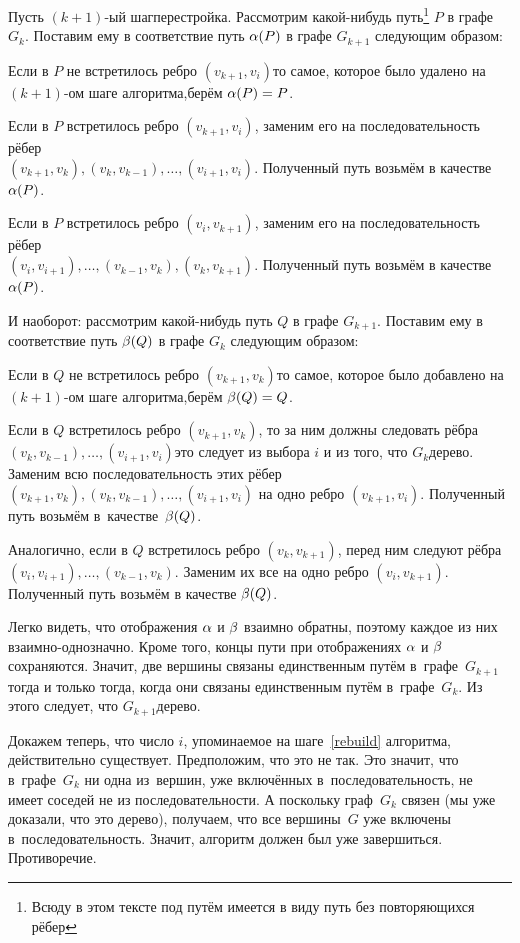 \documentclass[a4paper,12pt]{article}
\begin{document}
Пусть $(k+1)$-ый шаг\т перестройка. Рассмотрим какой-нибудь путь\footnote{Всюду в этом тексте под путём имеется в виду путь без повторяющихся рёбер} $P$ в графе $G_k$. Поставим ему в соответствие путь $\alpha(P)$ в графе $G_{k+1}$ следующим образом:
\begin{items}{-3}
\item
Если в $P$ не встретилось ребро $(v_{k+1}, v_i)$\т то самое, которое было удалено на $(k+1)$-ом шаге алгоритма,\т берём $\alpha(P) = P$.
\item
Если в $P$ встретилось ребро $(v_{k+1}, v_i)$, заменим его на последовательность рёбер\\ $(v_{k+1}, v_k), (v_k, v_{k-1}), \ldots, (v_{i+1}, v_i)$. Полученный путь возьмём в качестве $\alpha(P)$.
\item
Если в $P$ встретилось ребро $(v_i, v_{k+1})$, заменим его на последовательность рёбер\\ $(v_i, v_{i+1}), \ldots, (v_{k-1}, v_k), (v_k, v_{k+1})$. Полученный путь возьмём в качестве $\alpha(P)$.
\end{items}
И наоборот: рассмотрим какой-нибудь путь $Q$ в графе $G_{k+1}$. Поставим ему в соответствие путь $\beta(Q)$ в графе $G_k$ следующим образом:
\begin{items}{-3}
\item
Если в $Q$ не встретилось ребро $(v_{k+1}, v_k)$\т то самое, которое было добавлено на $(k+1)$-ом шаге алгоритма,\т берём $\beta(Q) = Q$.
\item
Если в $Q$ встретилось ребро $(v_{k+1}, v_k)$, то за ним должны следовать рёбра $(v_k, v_{k-1}), \ldots, (v_{i+1}, v_i)$\т это следует из выбора $i$ и из того, что $G_k$\т дерево. Заменим всю последовательность этих рёбер $(v_{k+1}, v_k), (v_k, v_{k-1}), \ldots, (v_{i+1}, v_i)$ на одно ребро $(v_{k+1}, v_i)$. Полученный путь возьмём в~качестве~$\beta(Q)$.
\item
Аналогично, если в $Q$ встретилось ребро $(v_k, v_{k+1})$, перед ним следуют рёбра $(v_i, v_{i+1}), \ldots, (v_{k-1}, v_k)$. Заменим их все на одно ребро $(v_i, v_{k+1})$. Полученный путь возьмём в качестве $\beta(Q)$.
\end{items}
Легко видеть, что отображения $\alpha$ и $\beta$ взаимно обратны, поэтому каждое из них взаимно-однозначно. Кроме того, концы пути при отображениях $\alpha$ и $\beta$ сохраняются. Значит, две вершины связаны единственным путём в~графе~$G_{k+1}$ тогда и только тогда, когда они связаны единственным путём в~графе~$G_k$. Из этого следует, что $G_{k+1}$\т дерево.

Докажем теперь, что число $i$, упоминаемое на шаге~\ref{rebuild} алгоритма, действительно существует. Предположим, что это не так. Это значит, что в~графе~$G_k$ ни одна из~вершин, уже включённых в~последовательность, не имеет соседей не из последовательности. А поскольку граф~$G_k$ связен (мы уже доказали, что это дерево), получаем, что все вершины~$G$ уже включены в~последовательность. Значит, алгоритм должен был уже завершиться. Противоречие.
\end{document}
